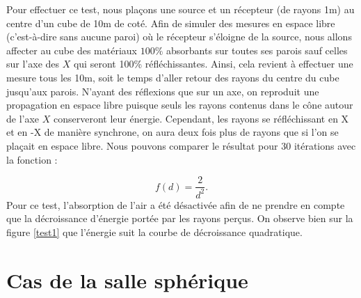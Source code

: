 Pour effectuer ce test, nous plaçons une source et un récepteur (de rayons 1m) au centre d'un cube de 10m de coté. Afin de simuler des mesures en espace libre (c'est-à-dire sans aucune paroi) où le récepteur s'éloigne de la source, nous allons affecter au cube des matériaux $100\%$ absorbants sur toutes ses parois sauf celles sur l'axe des $X$ qui seront 100\% réfléchissantes. Ainsi, cela revient à effectuer une mesure tous les 10m, soit le temps d'aller retour des rayons du centre du cube jusqu'aux parois. N'ayant des réflexions que sur un axe, on reproduit une propagation en espace libre puisque seuls les rayons contenus dans le cône autour de l'axe $X$ conserveront leur énergie. Cependant, les rayons se réfléchissant en X et en -X de manière synchrone, on aura deux fois plus de rayons que si l'on se plaçait en espace libre. Nous pouvons comparer le résultat pour 30 itérations avec la fonction :

\begin{equation*}
f(d) = \frac{2}{d^2}.
\end{equation*}
Pour ce test, l'absorption de l'air a été désactivée afin de ne prendre en compte que la décroissance d'énergie portée par les rayons perçus. On observe bien sur la figure \ref{test1} que l'énergie suit la courbe de décroissance quadratique.
 		
		
\section{Cas de la salle sphérique}

